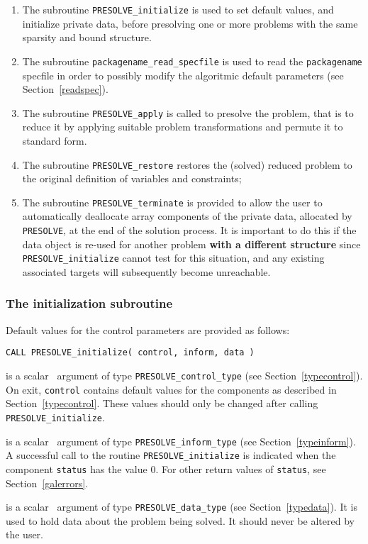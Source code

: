 \documentclass{galahad}
\newcommand{\packagename}{PRESOLVE}
\begin{document}
\begin{enumerate}
\item The subroutine {\tt \packagename\_initialize}
      is used to set default values, and initialize private data,
      before presolving one or more problems with the
      same sparsity and bound structure.
\item The subroutine {\tt packagename\_read\_specfile}
      is used to read the {\tt packagename} specfile in order to
      possibly modify the algoritmic default parameters (see
      Section~\ref{readspec}).
\item The subroutine {\tt \packagename\_apply}
      is called to presolve the problem, that is to reduce it by applying
      suitable problem transformations and permute it to standard form.
\item The subroutine {\tt \packagename\_restore}
      restores the (solved) reduced problem to the original definition
      of variables and constraints;
\item The subroutine {\tt \packagename\_terminate}
      is provided to allow the user to automatically deallocate array
      components of the private data, allocated by
      {\tt \packagename}, at the end of the solution process.
      It is important to do this if the data object is re-used for another
      problem {\bf with a different structure}
      since {\tt \packagename\_initialize} cannot test for this situation,
      and any existing associated targets will subsequently become unreachable.
\end{enumerate}


\subsubsection{The initialization subroutine}\label{subinit}


Default values for the control parameters are provided as follows:
\vspace*{1mm}

\hspace{8mm}
{\tt CALL \packagename\_initialize( control, inform, data )}

\begin{description}
 is a scalar \intentout\ argument of type
{\tt \packagename\_control\_type}
(see Section~\ref{typecontrol}).
On exit, {\tt control} contains default values for the components as
described in Section~\ref{typecontrol}.
These values should only be changed after calling
{\tt \packagename\_initialize}.

 is a scalar \intentout\ argument of type
{\tt \packagename\_inform\_type} (see Section~\ref{typeinform}).
A successful call to the routine {\tt \packagename\_initialize}
is indicated when the  component {\tt status} has the value 0.
For other return values of {\tt status}, see Section~\ref{galerrors}.

 is a scalar \intentinout\ argument of type
{\tt \packagename\_data\_type}
(see Section~\ref{typedata}). It is used to hold data about the problem being
solved. It should never be altered by the user.
\end{description}
\end{document}
